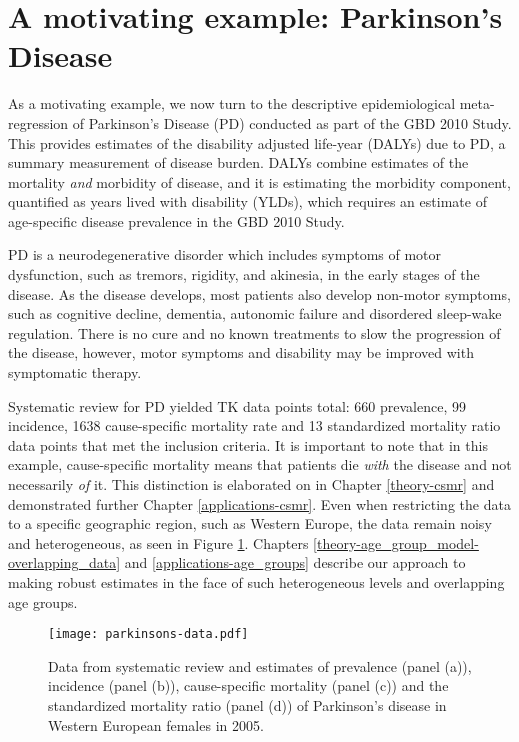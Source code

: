 \section{A motivating example: Parkinson's Disease}
\label{intro-complete_ex}

As a motivating example, we now turn to the descriptive epidemiological meta-regression of Parkinson's Disease (PD) conducted as part of the GBD 2010 Study.  This provides estimates of the disability adjusted life-year (DALYs) due to PD, a summary measurement of disease burden.  DALYs combine estimates of the mortality \emph{and} morbidity of disease, and it is estimating the morbidity component, quantified as years lived with disability (YLDs), which requires an estimate of age-specific disease prevalence in the GBD 2010 Study.

PD is a neurodegenerative disorder which includes symptoms of motor dysfunction, such as tremors, rigidity, and akinesia, in the early stages of the disease.  As the disease develops, most patients also develop non-motor symptoms, such as cognitive decline, dementia, autonomic failure and disordered sleep-wake regulation.  There is no cure and no known treatments to slow the progression of the disease, however, motor symptoms and disability may be improved with symptomatic therapy.\cite{poewe_natural_2006, pollock_prevalence_1966}

Systematic review for PD yielded TK data points total: 660 prevalence, 99 incidence, 1638 cause-specific mortality rate and 13 standardized mortality ratio data points that met the inclusion criteria.  It is important to note that in this example, cause-specific mortality means that patients die \emph{with} the disease and not necessarily \emph{of} it.  This distinction is elaborated on in Chapter \ref{theory-csmr} and demonstrated further Chapter \ref{applications-csmr}.  Even when restricting the data to a specific geographic region, such as Western Europe, the data remain noisy and heterogeneous, as seen in Figure \ref{fig:intro-parkinsons data}. Chapters \ref{theory-age_group_model-overlapping_data} and \ref{applications-age_groups} describe our approach to making robust estimates in the face of such heterogeneous levels and overlapping age groups.

    \begin{figure}[h]
        \begin{center}
            \texttt{[image: parkinsons-data.pdf]}
            \caption{Data from systematic review and estimates of prevalence (panel (a)), incidence (panel (b)), cause-specific mortality (panel (c)) and the standardized mortality ratio (panel (d)) of Parkinson's disease in Western European females in 2005.}
            \label{fig:intro-parkinsons data}
        \end{center}
    \end{figure} 


